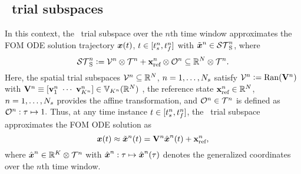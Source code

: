 \subsection{\spatialAcronym\ trial subspaces}
In this context, the \spatialAcronym\ trial subspace over the $n$th time window approximates
the FOM ODE solution trajectory ${\boldsymbol x}(t)$,
$t\in[t_s^{n},t_f^{n}]$ 
with $\tilde{\boldsymbol x}^{n} \in \mathcal{ ST }_{\text{S}}^{n}$, where
\begin{equation}\label{eq:sttrialspace}
 \mathcal{ ST }_{\text{S}}^{n} \vcentcolon= 
	\mathcal{V }^{n} \otimes \mathcal{T}^{n} +
	\mathbf{x}_\text{ref}^{n}\otimes\mathcal{O}^n\subseteq\mathbb{R}^{N} \otimes \mathcal{T}^{n}.
\end{equation}
Here, the spatial trial subspaces $\mathcal{V }^{n}\subseteq\mathbb{R}^{N}$,
$n=1,\ldots,N_s$ satisfy 
$\mathcal{V }^{n}\vcentcolon=\mathrm{Ran}(\mathbf {V}^{n})$ with 
$\basismatArg{n}\equiv[\basisvecArg{n}_1\ \cdots\
\basisvecArg{n}_{\romdimArg{n}}]\in
\RRStar{\romdimArg{n}}{\fomdim}
$ , the reference state $\mathbf{x}_\text{ref}^{n} \in \mathbb{R}^{N}$, $n=1,\ldots,N_s$ provides the affine transformation, 
and  
$\mathcal{O}^n\in\mathcal{T}^{n}$ is defined as
$\mathcal{O}^n:\tau\mapsto 1.$
Thus, at any time instance $t\in[t_s^{n},t_f^{n}]$, the
\spatialAcronym\ trial subspace 
approximates the FOM ODE solution as
\begin{equation}\label{eq:affine_trialspace_tclsrm}
	{\boldsymbol x}(t)\approx \tilde{\boldsymbol x}^{n}(t) = \mathbf {V}^{n}
	\hat{ \boldsymbol x}^{n}(t) + \mathbf{x}_\text{ref}^{n},
\end{equation}
where $\hat{ \boldsymbol x}^{n} \in \mathbb{R}^{K} \otimes \mathcal{T}^{n}$ with
$\hat{ \boldsymbol x}^{n}: \tau\mapsto \hat{ \boldsymbol x}^{n}(\tau)
$ denotes the generalized coordinates over the $n$th time window. 


